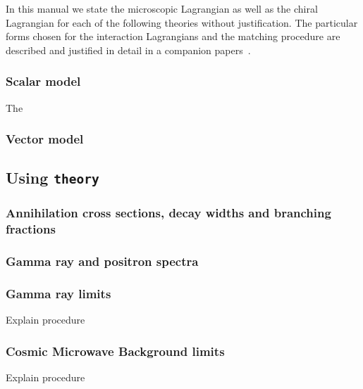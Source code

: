 In this manual we state the microscopic Lagrangian as well as the chiral Lagrangian for each of the following theories without justification. The particular forms chosen for the interaction Lagrangians and the matching procedure are described and justified in detail in a companion papers~\cite{matching_paper}.

\subsubsection{Scalar model}

The 

\subsubsection{Vector model}

\subsection{Using \texttt{theory}}%
\label{sub:using_theory}

\subsubsection{Annihilation cross sections, decay widths and branching fractions}

\subsubsection{Gamma ray and positron spectra}

\subsubsection{Gamma ray limits}

Explain procedure

\subsubsection{Cosmic Microwave Background limits}

Explain procedure

